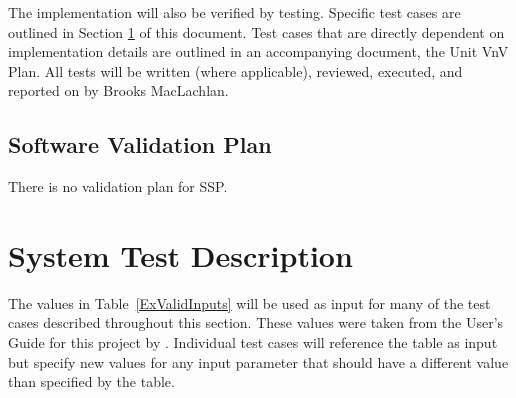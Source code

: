 \documentclass[12pt, titlepage]{article}
\newcommand{\progname}{SSP}
\begin{document}
\noindent The implementation will also be verified by testing. Specific test 
cases are outlined in Section \ref{sec_System} of this document. Test cases 
that are directly dependent on implementation details are outlined in an 
accompanying document, the Unit VnV Plan. All tests will be written (where 
applicable), reviewed, executed, and reported on by Brooks MacLachlan.

\subsection{Software Validation Plan}

There is no validation plan for \progname{}.

\section{System Test Description} \label{sec_System}

The values in Table~\ref{ExValidInputs} will be used as input for 
many of the test cases described throughout this section. These values were 
taken from the User's Guide for this project by \cite{UserGuide}. Individual 
test cases will reference the table as input but specify new values for any 
input parameter that should have a different value than specified by the table.
\end{document}
